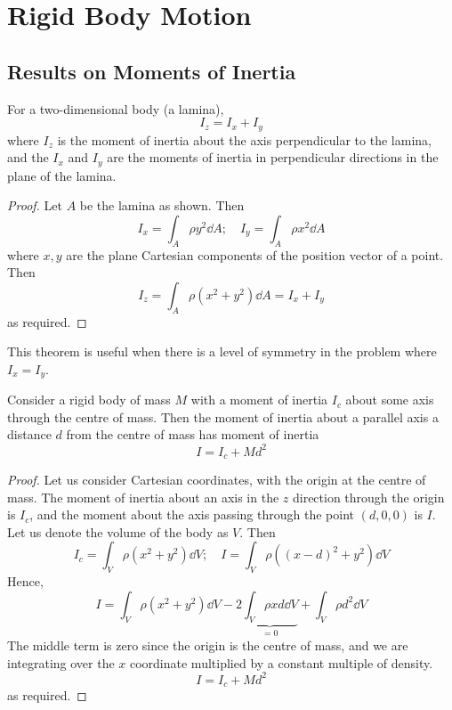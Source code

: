 \documentclass{article}
\begin{document}
\section{Rigid Body Motion}
\subsection{Results on Moments of Inertia}
\begin{theorem}
	For a two-dimensional body (a lamina),
	\[ I_z = I_x + I_y \]
	where $I_z$ is the moment of inertia about the axis perpendicular to the lamina, and the $I_x$ and $I_y$ are the moments of inertia in perpendicular directions in the plane of the lamina.
\end{theorem}
\begin{proof}
	Let $A$ be the lamina as shown. Then
	\[ I_x = \int_A \rho y^2 \dd{A};\quad I_y = \int_A \rho x^2 \dd{A} \]
	where $x, y$ are the plane Cartesian components of the position vector of a point. Then
	\[ I_z = \int_A \rho (x^2 + y^2) \dd{A} = I_x + I_y \]
	as required.
\end{proof}
\noindent This theorem is useful when there is a level of symmetry in the problem where $I_x = I_y$.
\begin{theorem}
	Consider a rigid body of mass $M$ with a moment of inertia $I_c$ about some axis through the centre of mass. Then the moment of inertia about a parallel axis a distance $d$ from the centre of mass has moment of inertia
	\[ I = I_c + Md^2 \]
\end{theorem}
\begin{proof}
	Let us consider Cartesian coordinates, with the origin at the centre of mass. The moment of inertia about an axis in the $z$ direction through the origin is $I_c$, and the moment about the axis passing through the point $(d, 0, 0)$ is $I$. Let us denote the volume of the body as $V$. Then
	\[ I_c = \int_V \rho (x^2 + y^2) \dd{V};\quad I = \int_V \rho ((x-d)^2 + y^2) \dd{V} \]
	Hence,
	\[ I = \int_V \rho (x^2 + y^2) \dd{V} - 2\underbrace{\int_V \rho xd \dd{V}}_{=0} + \int_V \rho d^2 \dd{V} \]
	The middle term is zero since the origin is the centre of mass, and we are integrating over the $x$ coordinate multiplied by a constant multiple of density.
	\[ I = I_c + Md^2 \]
	as required.
\end{proof}
\end{document}
